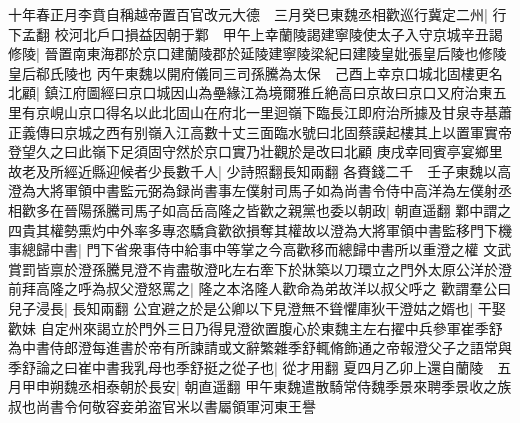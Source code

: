十年春正月李賁自稱越帝置百官改元大德　三月癸巳東魏丞相歡巡行冀定二州|{
	行下孟翻}
校河北戶口損益因朝于鄴　甲午上幸蘭陵謁建寧陵使太子入守京城辛丑謁修陵|{
	晉置南東海郡於京口建蘭陵郡於延陵建寧陵梁紀曰建陵皇妣張皇后陵也修陵皇后郗氏陵也}
丙午東魏以開府儀同三司孫騰為太保　己酉上幸京口城北固樓更名北顧|{
	鎮江府圖經曰京口城因山為壘緣江為境爾雅丘絶高曰京故曰京口又府治東五里有京峴山京口得名以此北固山在府北一里迴嶺下臨長江即府治所據及甘泉寺基蕭正義傳曰京城之西有别嶺入江高數十丈三面臨水號曰北固蔡謨起樓其上以置軍實帝登望久之曰此嶺下足須固守然於京口實乃壮觀於是改曰北顧}
庚戌幸囘賓亭宴鄉里故老及所經近縣迎候者少長數千人|{
	少詩照翻長知兩翻}
各賚錢二千　壬子東魏以高澄為大將軍領中書監元弼為録尚書事左僕射司馬子如為尚書令侍中高洋為左僕射丞相歡多在晉陽孫騰司馬子如高岳高隆之皆歡之親黨也委以朝政|{
	朝直遥翻}
鄴中謂之四貴其權勢熏灼中外率多專恣驕貪歡欲損奪其權故以澄為大將軍領中書監移門下機事總歸中書|{
	門下省衆事侍中給事中等掌之今高歡移而總歸中書所以重澄之權}
文武賞罰皆禀於澄孫騰見澄不肯盡敬澄叱左右牽下於牀築以刀環立之門外太原公洋於澄前拜高隆之呼為叔父澄怒罵之|{
	隆之本洛隆人歡命為弟故洋以叔父呼之}
歡謂羣公曰兒子浸長|{
	長知兩翻}
公宜避之於是公卿以下見澄無不聳懼庫狄干澄姑之婿也|{
	干娶歡妹}
自定州來謁立於門外三日乃得見澄欲置腹心於東魏主左右擢中兵參軍崔季舒為中書侍郎澄每進書於帝有所諫請或文辭繁雜季舒輒脩飾通之帝報澄父子之語常與季舒論之曰崔中書我乳母也季舒挺之從子也|{
	從才用翻}
夏四月乙卯上還自蘭陵　五月甲申朔魏丞相泰朝於長安|{
	朝直遥翻}
甲午東魏遣散騎常侍魏季景來聘季景收之族叔也尚書令何敬容妾弟盗官米以書屬領軍河東王譽

